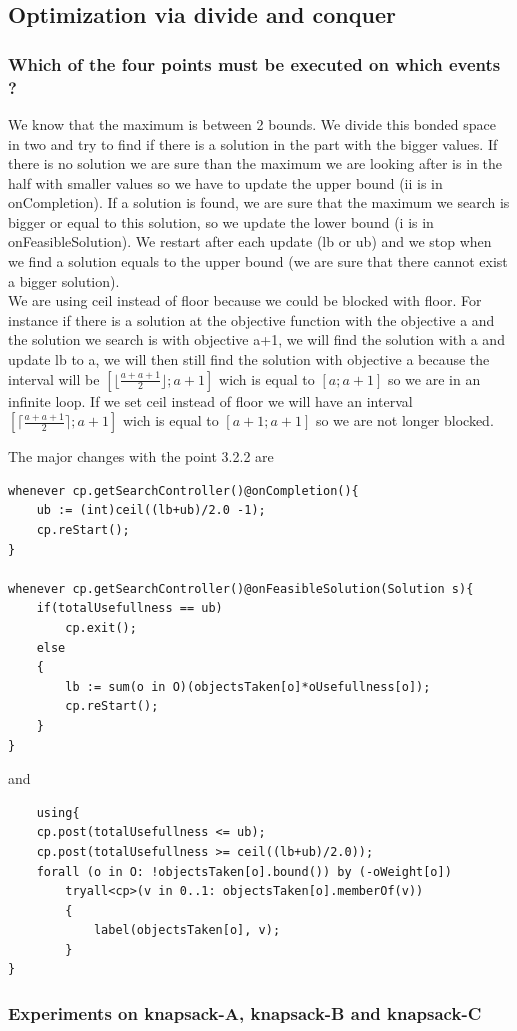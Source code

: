 \documentclass{eplDoc}
\begin{document}
\subsection{Optimization via divide and conquer} %
\subsubsection{Which of the four points must be executed on which events ?}
We know that the maximum is between 2 bounds.  We divide this bonded space in two and try to find if there is a solution in the part with the bigger values.  If there is no solution we are sure than the maximum we are looking after is in the half with smaller values so we have to update the upper bound (ii is in onCompletion).  If a solution is found, we are sure that the maximum we search is bigger or equal to this solution, so we update the lower bound (i is in onFeasibleSolution). We restart after each update (lb or ub) and we stop when we find a solution equals to the upper bound (we are sure that there cannot exist a bigger solution).\\
We are using ceil instead of floor because we could be blocked with floor.  For instance if there is a solution at the objective function with the objective a and the solution we search is with objective a+1, we will find the solution with a and update lb to a, we will then still find the solution with objective a because the interval will be $\left[ \lfloor \frac{a+a+1}2 \rfloor; a+1 \right]$ wich is equal to $\left[ a ; a+1 \right]$ so we are in an infinite loop.  If we set ceil instead of floor we will have an interval $\left[ \lceil \frac{a+a+1}2 \rceil; a+1 \right]$ wich is equal to $\left[ a+1 ; a+1 \right]$ so we are not longer blocked.

The major changes with the point 3.2.2 are
\begin{lstlisting}
whenever cp.getSearchController()@onCompletion(){
    ub := (int)ceil((lb+ub)/2.0 -1);
    cp.reStart();
}

whenever cp.getSearchController()@onFeasibleSolution(Solution s){
    if(totalUsefullness == ub)
        cp.exit();
    else
    {
        lb := sum(o in O)(objectsTaken[o]*oUsefullness[o]);
        cp.reStart();
    }
}
\end{lstlisting}
and 
\begin{lstlisting}
    using{
    cp.post(totalUsefullness <= ub);
    cp.post(totalUsefullness >= ceil((lb+ub)/2.0));
    forall (o in O: !objectsTaken[o].bound()) by (-oWeight[o])
        tryall<cp>(v in 0..1: objectsTaken[o].memberOf(v))
        {
            label(objectsTaken[o], v);
        } 
}
\end{lstlisting}
\subsubsection{Experiments on knapsack-A, knapsack-B and knapsack-C}
\end{document}
